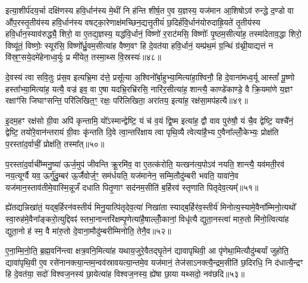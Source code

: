 इत्या॒शीर्प॑दय॒र्चा दक्षि॑णस्य हवि॒र्धान॑स्य मे॒थीं नि ह॑न्ति शीर्\mbox{}ष॒त ए॒व य॒ज्ञस्य॒ यज॑मान आ॒शिषो\-ऽव॑ रुन्द्धे द॒ण्डो वा औ॑प॒रस्तृ॒तीय॑स्य हवि॒र्धान॑स्य वषट्का॒रेणाक्ष॑मच्छिन॒द्यत्तृ॒तीयं॑ छ॒दिर्\mbox{}ह॑वि॒र्धान॑योरुदाह्रि॒यते॑ तृ॒तीय॑स्य हवि॒र्धान॒स्याव॑रुद्ध्यै॒ शिरो॒ वा ए॒तद्य॒ज्ञस्य॒ यद्ध॑वि॒र्धानं॒ विष्णो॑ र॒राट॑मसि॒ विष्णोः᳚ पृ॒ष्ठम॒सीत्या॑ह॒ तस्मा॑देताव॒द्धा शिरो॒ विष्यू॑तं॒ विष्णोः॒ स्यूर॑सि॒ विष्णो᳚र्ध्रु॒वम॒सीत्या॑ह वैष्ण॒वꣳ हि दे॒वत॑या हवि॒र्धानं॒ यम्प्र॑थ॒मं ग्र॒न्थिं ग्र॑थ्नी॒याद्यत्तं न वि॑स्र॒ꣳ॒सये॒दमे॑हेनाध्व॒र्युः प्र मी॑येत॒ तस्मा॒थ्स वि॒स्रस्यः॑॥४८॥

{\anuvakamend[{पत्नी॑ हन्युर्वा पृथि॒व्या विष्यू॑तं॒ विष्णोः॒ षड्विꣳ॑शतिश्च॥९॥}]}

दे॒वस्य॑ त्वा सवि॒तुः प्र॑स॒व इत्यभ्रि॒मा द॑त्ते॒ प्रसू᳚त्या अ॒श्विनो᳚र्बा॒हुभ्या॒मित्या॑हा॒श्विनौ॒ हि दे॒वाना॑मध्व॒र्यू आस्तां᳚ पू॒ष्णो हस्ता᳚भ्या॒मित्या॑ह॒ यत्यै॒ वज्र॑ इव॒ वा ए॒षा यदभ्रि॒रभ्रि॑रसि॒ नारि॑र॒सीत्या॑ह॒ शान्त्यै॒ काण्डे॑काण्डे॒ वै क्रि॒यमा॑णे य॒ज्ञꣳ रक्षाꣳ॑सि जिघाꣳसन्ति॒ परि॑लिखित॒ꣳ॒ रक्षः॒ परि॑लिखिता॒ अरा॑तय॒ इत्या॑ह॒ रक्ष॑सा॒मप॑हत्यै॥४९॥

इ॒दम॒हꣳ रक्ष॑सो ग्री॒वा अपि॑ कृन्तामि॒ यो᳚\-ऽस्मान्द्वेष्टि॒ यं च॑ व॒यं द्वि॒ष्म इत्या॑ह॒ द्वौ वाव पुरु॑षौ॒ यं चै॒व द्वेष्टि॒ यश्चै॑नं॒ द्वेष्टि॒ तयो॑रे॒वान॑न्तरायं ग्री॒वाः कृ॑न्तति दि॒वे त्वा॒न्तरि॑क्षाय त्वा पृथि॒व्यै त्वेत्या॑है॒भ्य ए॒वैना᳚ल्लोँ॒केभ्यः॒ प्रोक्ष॑ति प॒रस्ता॑द॒र्वाचीं॒ प्रोक्ष॑ति॒ तस्मा᳚त्॥५०॥

प॒रस्ता॑द॒र्वाची᳚म्मनु॒ष्या॑ ऊर्ज॒मुप॑ जीवन्ति क्रू॒रमि॑व॒ वा ए॒तत्क॑रोति॒ यत्खन॑त्य॒पो\-ऽव॑ नयति॒ शान्त्यै॒ यव॑मती॒रव॑ नय॒त्यूर्ग्वै यव॒ ऊर्गु॑दु॒म्बर॑ ऊ॒र्जैवोर्ज॒ꣳ॒ सम॑र्धयति॒ यज॑मानेन॒ सम्मि॒तौदु॑म्बरी भवति॒ यावा॑ने॒व यज॑मान॒स्ताव॑तीमे॒वास्मि॒न्नूर्जं॑ दधाति पितृ॒णाꣳ सद॑नम॒सीति॑ ब॒र्\mbox{}हिरव॑ स्तृणाति पितृदेव॒त्यम्᳚॥५१॥

ह्ये॑तद्यन्निखा॑तं॒ यद्ब॒र्\mbox{}हिरन॑वस्तीर्य मिनु॒यात्पि॑तृदेव॒त्या॑ निखा॑ता स्याद्ब॒र्\mbox{}हिर॑व॒स्तीर्य॑ मिनोत्य॒स्यामे॒वैना᳚म्मिनो॒त्यथो᳚ स्वा॒रुह॑मे॒वैना᳚ङ्करो॒त्युद्दिवꣴ॑ स्तभा॒नान्तरि॑क्षम्पृ॒णेत्या॑है॒षाल्लोँ॒कानां॒ विधृ॑त्यै द्युता॒नस्त्वा॑ मारु॒तो मि॑नो॒त्वित्या॑ह द्युता॒नो ह॑ स्म॒ वै मा॑रु॒तो दे॒वाना॒मौदु॑म्बरीम्मिनोति॒ तेनै॒व॥५२॥

ए॒ना॒म्मि॒नो॒ति॒ ब्र॒ह्म॒वनि॑न्त्वा क्षत्र॒वनि॒मित्या॑ह यथाय॒जुरे॒वैतद्घृ॒तेन॑ द्यावापृथिवी॒ आ पृ॑णेथा॒मित्यौदु॑म्बर्यां जुहोति॒ द्यावा॑पृथि॒वी ए॒व रसे॑नानक्त्या॒न्तम॒न्वव॑स्रावयत्या॒न्तमे॒व यज॑मानं॒ तेज॑सा\-ऽनक्त्यै॒न्द्रम॒सीति॑ छ॒दिरधि॒ नि द॑धात्यै॒न्द्रꣳ हि दे॒वत॑या॒ सदो॑ विश्वज॒नस्य॑ छा॒येत्या॑ह विश्वज॒नस्य॒ ह्ये॑षा छा॒या यथ्सदो॒ नव॑छदि॥५३॥


